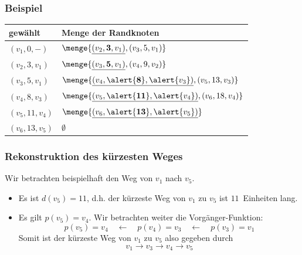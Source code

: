 \documentclass{beamer}
\begin{document}
\begin{frame} \frametitle{Beispiel}
	\centering
	\renewcommand{\arraystretch}{1.5}
	\begin{tabular}{l|l}
		\hline
		gewählt & Menge der Randknoten \\ \hline
		$(v_1,0,-)$ & $\menge{\underline{(v_2,\mathbf{3},v_1)}, (v_3, 5, v_1)}$ \\
		$(v_2, 3, v_1)$ & $\menge{\underline{(v_3, \mathbf{5}, v_1)}, (v_4, 9, v_2)}$ \\
		$(v_3,5,v_1)$ & $\menge{\underline{(v_4, \alert{\mathbf{8}}, \alert{v_3})}, (v_5, 13, v_3)}$ \\
		$(v_4, 8, v_3)$ & $\menge{\underline{(v_5, \alert{\mathbf{11}}, \alert{v_4})}, (v_6, 18, v_4)}$ \\
		$(v_5, 11, v_4)$ & $\menge{\underline{(v_6, \alert{\mathbf{13}}, \alert{v_5})}}$ \\
		$(v_6, 13, v_5)$ & $\emptyset$ \\ \hline
	\end{tabular}
\end{frame}

\begin{frame} \frametitle{Rekonstruktion des kürzesten Weges}
	Wir betrachten beispielhaft den Weg von $v_1$ nach $v_5$.
	\begin{itemize}
		\item Es ist $d(v_5) = 11$, d.h. der kürzeste Weg von $v_1$ zu $v_5$ ist $11$~Einheiten lang.
		\item Es gilt $p(v_5) = v_4$. Wir betrachten weiter die Vorgänger-Funktion:
		\begin{equation*}
		p(v_5) = v_4 \quad \leftarrow \quad p(v_4) = v_3 \quad \leftarrow \quad p(v_3) = v_1
		\end{equation*}
		Somit ist der kürzeste Weg von $v_1$ zu $v_5$ also gegeben durch
		\begin{equation*}
		v_1 \to v_3 \to v_4 \to v_5
		\end{equation*}
	\end{itemize}
\end{frame}
\end{document}
